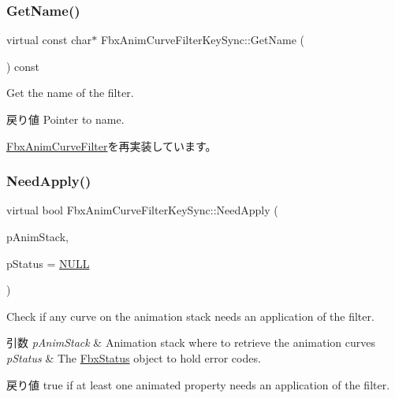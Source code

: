 \subsubsection{\texorpdfstring{Get\+Name()}{GetName()}}
{\footnotesize\ttfamily virtual const char$\ast$ Fbx\+Anim\+Curve\+Filter\+Key\+Sync\+::\+Get\+Name (\begin{DoxyParamCaption}{ }\end{DoxyParamCaption}) const\hspace{0.3cm}{\ttfamily [virtual]}}

Get the name of the filter. \begin{DoxyReturn}{戻り値}
Pointer to name. 
\end{DoxyReturn}


\hyperlink{class_fbx_anim_curve_filter_abd559d5052fbb072042e59241940a35c}{Fbx\+Anim\+Curve\+Filter}を再実装しています。

\mbox{\label{class_fbx_anim_curve_filter_key_sync_a987ccf74bf3bdf7828812067d895950c}} 
\subsubsection{\texorpdfstring{Need\+Apply()}{NeedApply()}\hspace{0.1cm}{\footnotesize\ttfamily [1/5]}}
{\footnotesize\ttfamily virtual bool Fbx\+Anim\+Curve\+Filter\+Key\+Sync\+::\+Need\+Apply (\begin{DoxyParamCaption}\item[{\hyperlink{class_fbx_anim_stack}{Fbx\+Anim\+Stack} $\ast$}]{p\+Anim\+Stack,  }\item[{\hyperlink{class_fbx_status}{Fbx\+Status} $\ast$}]{p\+Status = {\ttfamily \hyperlink{fbxarch_8h_a070d2ce7b6bb7e5c05602aa8c308d0c4}{N\+U\+LL}} }\end{DoxyParamCaption})\hspace{0.3cm}{\ttfamily [virtual]}}

Check if any curve on the animation stack needs an application of the filter. 
\begin{DoxyParams}{引数}
{\em p\+Anim\+Stack} & Animation stack where to retrieve the animation curves \\
\hline
{\em p\+Status} & The \hyperlink{class_fbx_status}{Fbx\+Status} object to hold error codes. \\
\hline
\end{DoxyParams}
\begin{DoxyReturn}{戻り値}
{\ttfamily true} if at least one animated property needs an application of the filter. 
\end{DoxyReturn}


